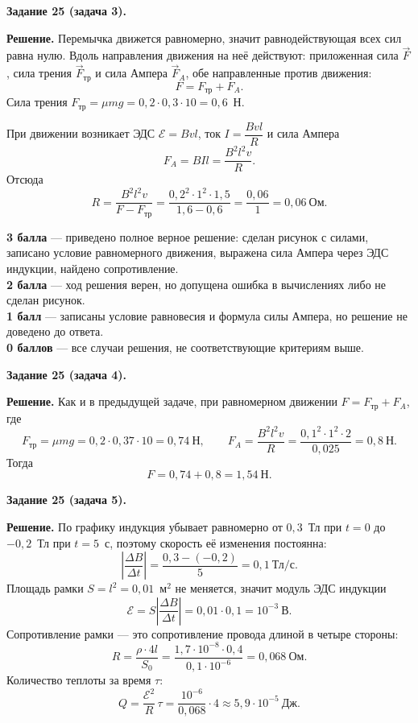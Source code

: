 \documentclass[12pt,a4paper]{article}
\begin{document}
\begin{solutionbox}
\textbf{Задание 25 (задача 3).}

\textbf{Решение.} Перемычка движется равномерно, значит равнодействующая всех сил равна нулю. Вдоль
направления движения на неё действуют: приложенная сила $\vec F$, сила трения $\vec F_{\text{тр}}$ и
сила Ампера $\vec F_A$, обе направленные против движения:
\[ F=F_{\text{тр}}+F_A . \]
Сила трения $F_{\text{тр}}=\mu mg=0{,}2\cdot0{,}3\cdot10=0{,}6$~Н.

При движении возникает ЭДС $\mathcal{E}=Bvl$, ток $I=\dfrac{Bvl}{R}$ и сила Ампера
\[ F_A=BIl=\frac{B^{2}l^{2}v}{R}. \]
Отсюда
\[ R=\frac{B^{2}l^{2}v}{F-F_{\text{тр}}}
=\frac{0{,}2^{2}\cdot1^{2}\cdot1{,}5}{1{,}6-0{,}6}=\frac{0{,}06}{1}=0{,}06\ \text{Ом}. \]
\end{solutionbox}

\begin{critbox}
\textbf{3 балла} — приведено полное верное решение: сделан рисунок с силами, записано условие
равномерного движения, выражена сила Ампера через ЭДС индукции, найдено сопротивление.\\[0.3em]
\textbf{2 балла} — ход решения верен, но допущена ошибка в вычислениях либо не сделан
рисунок.\\[0.3em]
\textbf{1 балл} — записаны условие равновесия и формула силы Ампера, но решение не доведено до
ответа.\\[0.3em]
\textbf{0 баллов} — все случаи решения, не соответствующие критериям выше.
\end{critbox}

\begin{solutionbox}
\textbf{Задание 25 (задача 4).}

\textbf{Решение.} Как и в предыдущей задаче, при равномерном движении
$F=F_{\text{тр}}+F_A$, где
\[ F_{\text{тр}}=\mu mg=0{,}2\cdot0{,}37\cdot10=0{,}74\ \text{Н},\qquad
F_A=\frac{B^{2}l^{2}v}{R}=\frac{0{,}1^{2}\cdot1^{2}\cdot2}{0{,}025}=0{,}8\ \text{Н}. \]
Тогда
\[ F=0{,}74+0{,}8=1{,}54\ \text{Н}. \]
\end{solutionbox}

\begin{solutionbox}
\textbf{Задание 25 (задача 5).}

\textbf{Решение.} По графику индукция убывает равномерно от $0{,}3$~Тл при $t=0$ до $-0{,}2$~Тл при
$t=5$~с, поэтому скорость её изменения постоянна:
\[ \left|\frac{\Delta B}{\Delta t}\right|=\frac{0{,}3-(-0{,}2)}{5}=0{,}1\ \text{Тл/с}. \]
Площадь рамки $S=l^{2}=0{,}01$~м$^2$ не меняется, значит модуль ЭДС индукции
\[ \mathcal{E}=S\left|\frac{\Delta B}{\Delta t}\right|=0{,}01\cdot0{,}1=10^{-3}\ \text{В}. \]
Сопротивление рамки — это сопротивление провода длиной в четыре стороны:
\[ R=\frac{\rho\cdot4l}{S_0}=\frac{1{,}7\cdot10^{-8}\cdot0{,}4}{0{,}1\cdot10^{-6}}=0{,}068\ \text{Ом}. \]
Количество теплоты за время $\tau$:
\[ Q=\frac{\mathcal{E}^{2}}{R}\,\tau=\frac{10^{-6}}{0{,}068}\cdot4\approx5{,}9\cdot10^{-5}\ \text{Дж}. \]
\end{solutionbox}
\end{document}
